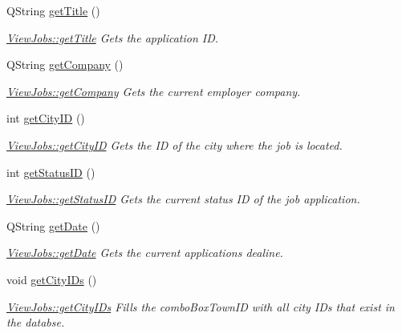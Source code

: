 \begin{DoxyCompactItemize}
Q\+String \mbox{\hyperlink{class_view_jobs_ae78f119d37c77a9e3e457ecfd78d7de3}{get\+Title}} ()
\begin{DoxyCompactList}\small\item\em \mbox{\hyperlink{class_view_jobs_ae78f119d37c77a9e3e457ecfd78d7de3}{View\+Jobs\+::get\+Title}} Gets the application ID. \end{DoxyCompactList}\item 
Q\+String \mbox{\hyperlink{class_view_jobs_a88d7c0a7a79bc7a7e02b524587983bf8}{get\+Company}} ()
\begin{DoxyCompactList}\small\item\em \mbox{\hyperlink{class_view_jobs_a88d7c0a7a79bc7a7e02b524587983bf8}{View\+Jobs\+::get\+Company}} Gets the current employer company. \end{DoxyCompactList}\item 
int \mbox{\hyperlink{class_view_jobs_adcafeca350b21a033aa630e042ee7947}{get\+City\+ID}} ()
\begin{DoxyCompactList}\small\item\em \mbox{\hyperlink{class_view_jobs_adcafeca350b21a033aa630e042ee7947}{View\+Jobs\+::get\+City\+ID}} Gets the ID of the city where the job is located. \end{DoxyCompactList}\item 
int \mbox{\hyperlink{class_view_jobs_a91696fde9f0a663bae929390aac8324b}{get\+Status\+ID}} ()
\begin{DoxyCompactList}\small\item\em \mbox{\hyperlink{class_view_jobs_a91696fde9f0a663bae929390aac8324b}{View\+Jobs\+::get\+Status\+ID}} Gets the current status ID of the job application. \end{DoxyCompactList}\item 
Q\+String \mbox{\hyperlink{class_view_jobs_af046f9201cc6031e070b4f9b613a35f9}{get\+Date}} ()
\begin{DoxyCompactList}\small\item\em \mbox{\hyperlink{class_view_jobs_af046f9201cc6031e070b4f9b613a35f9}{View\+Jobs\+::get\+Date}} Gets the current application\textquotesingle{}s dealine. \end{DoxyCompactList}\item 
\mbox{\label{class_view_jobs_a6cf031afcc4a09dfca54044fdf8c4f7b}} 
void \mbox{\hyperlink{class_view_jobs_a6cf031afcc4a09dfca54044fdf8c4f7b}{get\+City\+I\+Ds}} ()
\begin{DoxyCompactList}\small\item\em \mbox{\hyperlink{class_view_jobs_a6cf031afcc4a09dfca54044fdf8c4f7b}{View\+Jobs\+::get\+City\+I\+Ds}} Fills the combo\+Box\+Town\+ID with all city I\+Ds that exist in the databse. \end{DoxyCompactList}\item 

\end{DoxyCompactItemize}
